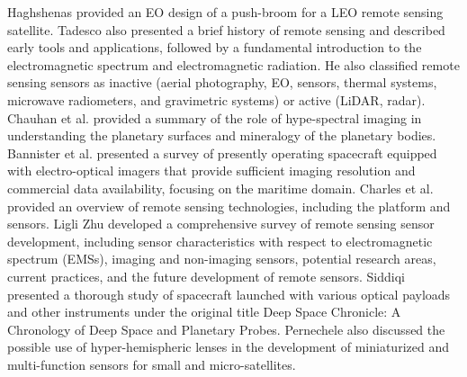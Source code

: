 \documentclass[final,5p,times,twocolumn,authoryear]{elsarticle}
\begin{document}
Haghshenas \citep{haghshenas2014electro} provided an EO design of a push-broom for a LEO remote sensing satellite. Tadesco \citep{tedesco2015remote} also presented a brief history of remote sensing and described early tools and applications, followed by a fundamental introduction to the electromagnetic spectrum and electromagnetic radiation. He also classified remote sensing sensors as inactive (aerial photography, EO, sensors, thermal systems, microwave radiometers, and gravimetric systems) or active (LiDAR, radar). Chauhan et al. \citep{chauhan2015hyperspectral} provided a summary of the role of hype-spectral imaging in understanding the planetary surfaces and mineralogy of the planetary bodies.  Bannister et al. \cite{bannister2015maritime} presented a survey of presently operating spacecraft equipped with electro-optical imagers that provide sufficient imaging resolution and commercial data availability, focusing on the maritime domain. Charles et al. \citep{toth2016remote} provided an overview of remote sensing technologies, including the platform and sensors.  Ligli Zhu \citep{zhu2018review} developed a comprehensive survey of remote sensing sensor development, including sensor characteristics with respect to electromagnetic spectrum (EMSs), imaging and non-imaging sensors, potential research areas, current practices, and the future development of remote sensors. Siddiqi \citep{siddiqi2018beyond} presented a thorough study of spacecraft launched with various optical payloads and other instruments under the original title Deep Space Chronicle: A Chronology of Deep Space and Planetary Probes. Pernechele \citep{pernechele2018hyper} also discussed the possible use of hyper-hemispheric lenses in the development of miniaturized and multi-function sensors for small and micro-satellites.\\
\end{document}
